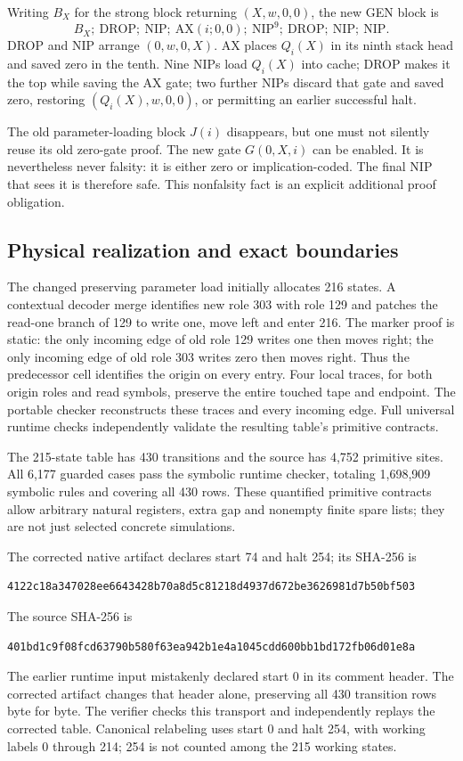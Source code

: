 \documentclass[11pt]{article}
\begin{document}
Writing $B_X$ for the strong block returning $(X,w,0,0)$, the new GEN block is
\[
 B_X;\ \mathrm{DROP};\ \mathrm{NIP};\ \mathrm{AX}(i;0,0);
 \ \mathrm{NIP}^{9};\ \mathrm{DROP};\ \mathrm{NIP};\ \mathrm{NIP}.
\]
DROP and NIP arrange $(0,w,0,X)$. AX places $Q_i(X)$ in its ninth stack head and saved zero in the tenth. Nine NIPs load $Q_i(X)$ into cache; DROP makes it the top while saving the AX gate; two further NIPs discard that gate and saved zero, restoring $(Q_i(X),w,0,0)$, or permitting an earlier successful halt.

The old parameter-loading block $J(i)$ disappears, but one must not silently reuse its old zero-gate proof. The new gate $G(0,X,i)$ can be enabled. It is nevertheless never falsity: it is either zero or implication-coded. The final NIP that sees it is therefore safe. This nonfalsity fact is an explicit additional proof obligation.

\subsection{Physical realization and exact boundaries}
The changed preserving parameter load initially allocates 216 states. A contextual decoder merge identifies new role 303 with role 129 and patches the read-one branch of 129 to write one, move left and enter 216. The marker proof is static: the only incoming edge of old role 129 writes one then moves right; the only incoming edge of old role 303 writes zero then moves right. Thus the predecessor cell identifies the origin on every entry. Four local traces, for both origin roles and read symbols, preserve the entire touched tape and endpoint. The portable checker reconstructs these traces and every incoming edge. Full universal runtime checks independently validate the resulting table's primitive contracts.

The 215-state table has 430 transitions and the source has 4,752 primitive sites. All 6,177 guarded cases pass the symbolic runtime checker, totaling 1,698,909 symbolic rules and covering all 430 rows. These quantified primitive contracts allow arbitrary natural registers, extra gap and nonempty finite spare lists; they are not just selected concrete simulations.

The corrected native artifact declares start 74 and halt 254; its SHA-256 is
\begin{verbatim}
4122c18a347028ee6643428b70a8d5c81218d4937d672be3626981d7b50bf503
\end{verbatim}
The source SHA-256 is
\begin{verbatim}
401bd1c9f08fcd63790b580f63ea942b1e4a1045cdd600bb1bd172fb06d01e8a
\end{verbatim}
The earlier runtime input mistakenly declared start 0 in its comment header. The corrected artifact changes that header alone, preserving all 430 transition rows byte for byte. The verifier checks this transport and independently replays the corrected table. Canonical relabeling uses start 0 and halt 254, with working labels 0 through 214; 254 is not counted among the 215 working states.
\end{document}

